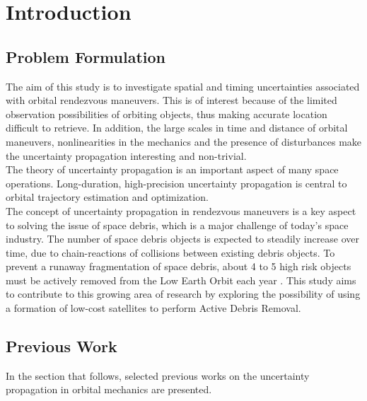 \section{Introduction}

\subsection{Problem Formulation}

The aim of this study is to investigate spatial and timing uncertainties associated with orbital rendezvous maneuvers. This is of interest because of the limited observation possibilities of orbiting objects, thus making accurate location difficult to retrieve. In addition, the large scales in time and distance of orbital maneuvers, nonlinearities in the mechanics and the presence of disturbances make the uncertainty propagation interesting and non-trivial. \\


The theory of uncertainty propagation is an important aspect of many space operations. Long-duration, high-precision uncertainty propagation is central to orbital trajectory estimation and optimization. \\


The concept of uncertainty propagation in rendezvous maneuvers is a key aspect to solving the issue of space debris, which is a major challenge of today's space industry. The number of space debris objects is expected to steadily increase over time, due to chain-reactions of collisions between existing debris objects. To prevent a runaway fragmentation of space debris, about 4 to 5 high risk objects must be actively removed from the Low Earth Orbit each year \cite{ESA_about_space_debris}. This study aims to contribute to this growing area of research by exploring the possibility of using a formation of low-cost satellites to perform Active Debris Removal. \\


\subsection{Previous Work}

In the section that follows, selected previous works on the uncertainty propagation in orbital mechanics are presented.  \\



